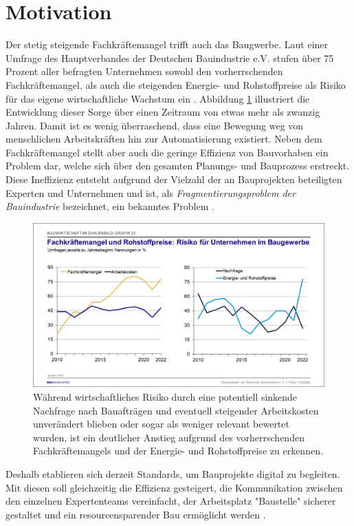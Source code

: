 \section{Motivation}
Der stetig steigende Fachkräftemangel trifft auch das Baugwerbe. 
Laut einer Umfrage des Hauptverbandes der Deutschen Bauindustrie e.V. stufen über 75 Prozent aller befragten Unternehmen sowohl den vorherrschenden Fachkräftemangel, als auch die steigenden Energie- und Rohstoffpreise als Risiko für das eigene wirtschaftliche Wachstum ein \cite{Bauindustrie:online}.
Abbildung \ref{fig:Fachkräftemangel} illustriert die Entwicklung dieser Sorge über einen Zeitraum von etwas mehr als zwanzig Jahren.
Damit ist es wenig überraschend, dass eine Bewegung weg von menschlichen Arbeitskräften hin zur Automatisierung existiert.
Neben dem Fachkräftemangel stellt aber auch die geringe Effizienz von Bauvorhaben ein Problem dar, welche sich über den gesamten Planungs- und Bauprozess erstreckt. 
Diese Ineffizienz entsteht aufgrund der Vielzahl der an Bauprojekten beteiligten Experten und Unternehmen und ist, als \textit{Fragmentierungsproblem der Bauindustrie} bezeichnet, ein bekanntes Problem  \cite{ConstructionFragmentation}.
\begin{figure}[h]
    \centering
    \includegraphics[width=0.7\columnwidth]{fig/Grafik_23.jpg}
    \caption{Während wirtschaftliches Risiko durch eine potentiell sinkende Nachfrage nach Bauafträgen und eventuell steigender Arbeitskosten unverändert blieben oder sogar als weniger relevant bewertet wurden, ist ein deutlicher Anstieg aufgrund des vorherrschenden Fachkräftemangels und der Energie- und Rohstoffpreise zu erkennen.}
    \label{fig:Fachkräftemangel}
\end{figure}
Deshalb etablieren sich derzeit Standards, um Bauprojekte digital zu begleiten.
Mit diesen soll gleichzeitig die Effizienz gesteigert, die Kommunikation zwischen den einzelnen Expertenteams vereinfacht, der Arbeitsplatz "Baustelle" sicherer gestaltet und ein resourcensparender Bau ermöglicht werden \cite{BIMforHe12:online} \cite{Top10Ben31:online}.
